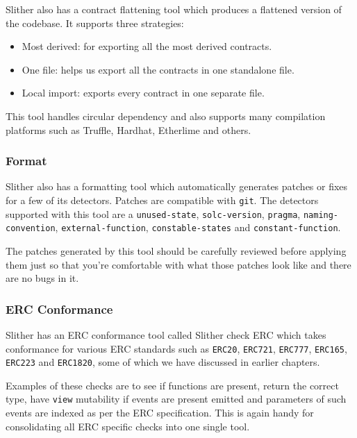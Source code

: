 Slither also has a contract flattening tool which produces a flattened
version of the codebase. It supports three strategies:

\begin{itemize}
\tightlist
\item
  Most derived: for exporting all the most derived contracts.
\item
  One file: helps us export all the contracts in one standalone file.
\item
  Local import: exports every contract in one separate file.
\end{itemize}

This tool handles circular dependency and also supports many compilation
platforms such as Truffle, Hardhat, Etherlime and others.

\subsubsection{Format}\label{format}

Slither also has a formatting tool which automatically generates patches
or fixes for a few of its detectors. Patches are compatible with
\texttt{git}. The detectors supported with this tool are a
\texttt{unused-state}, \texttt{solc-version}, \texttt{pragma},
\texttt{naming-convention}, \texttt{external-function},
\texttt{constable-states} and \texttt{constant-function}.

The patches generated by this tool should be carefully reviewed before
applying them just so that you're comfortable with what those patches
look like and there are no bugs in it.

\subsubsection{ERC Conformance}\label{erc-conformance}

Slither has an ERC conformance tool called Slither check ERC which takes
conformance for various ERC standards such as \texttt{ERC20},
\texttt{ERC721}, \texttt{ERC777}, \texttt{ERC165}, \texttt{ERC223} and
\texttt{ERC1820}, some of which we have discussed in earlier chapters.

Examples of these checks are to see if functions are present, return the
correct type, have \texttt{view} mutability if events are present
emitted and parameters of such events are indexed as per the ERC
specification. This is again handy for consolidating all ERC specific
checks into one single tool.


